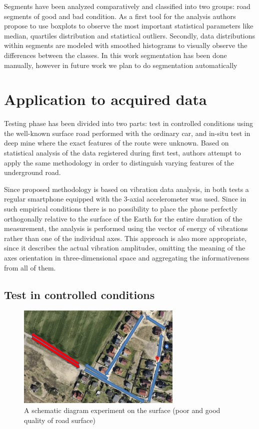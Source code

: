 \documentclass[10pt]{article}
\begin{document}
Segments have been analyzed comparatively and classified into two groups: road segments of good and bad condition. As a first tool for the analysis authors propose to use boxplots to observe the most important statistical parameters like median, quartiles distribution and statistical outliers. Secondly, data distributions within segments are modeled with smoothed histograms to visually observe the differences between the classes.
In this work segmentation has been done manually, however in future work we plan to do segmentation automatically\cite{wodecki2018technical, kucharczyk2017structural, hossa2017automatic, wylomanska2014signal, wylomanska2016impulsive}

\section{Application to acquired data}

Testing phase has been divided into two parts: test in controlled conditions using the well-known surface road performed with the ordinary car, and in-situ test in deep mine where the exact features of the route were unknown. Based on statistical analysis of the data registered during first test, authors attempt to apply the same methodology in order to distinguish varying features of the underground road.

Since proposed methodology is based on vibration data analysis, in both tests a regular smartphone equipped with the 3-axial accelerometer was used. Since in such empirical conditions there is no possibility to place the phone perfectly orthogonally relative to the surface of the Earth for the entire duration of the measurement, the analysis is performed using the vector of energy of vibrations rather than one of the individual axes. This approach is also more appropriate, since it describes the actual vibration amplitudes, omitting the meaning of the axes orientation in three-dimensional space and aggregating the informativeness from all of them.

\subsection{Test in controlled conditions}

\begin{figure}[ht!]
\centering
\includegraphics[width=0.7\textwidth]{wykresy/mapa.png}
\caption{A schematic diagram experiment on the surface (poor and good quality of road surface)}
\label{fig:mapa}
\end{figure}
\end{document}
